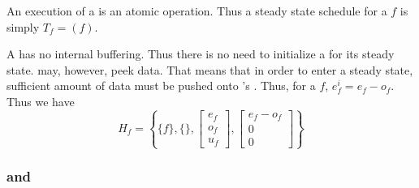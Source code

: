 \begin{comment}
This section will develop hierarchical scheduling techniques to
create initialization and steady state schedules. A simple
implementation of the hierarchical scheduling creates a
single-appearance schedule.  While single-appearance scheduling is
quite effective in scheduling {\StreamIt} programs, it is also easy
to construct programs that have {\feedbackloops} that are impossible
to schedule.  To alleviate the problem, the single-appearance
scheduling was slightly modified to allow {\feedbackloops} to
schedule programs using hierarchical push scheduling.  This does
not solve the problem altogether (some {\feedbackloops} are still
impossible to schedule using this technique), but this technique
is able to schedule many programs which cannot be scheduled with a
simple single-appearance scheduler.

Sample streams for techniques described here are taken from Figure
\ref{fig:hierarchical-schedule}.  The streams in Figure
\ref{fig:hierarchical-schedule} are identical to those in Figure
\ref{fig:steady-state} with exception of the {\feedbackloop}.
\end{comment}

\subsubsection{\filter}

An execution of a {\filter} is an atomic operation.  Thus a steady
state schedule for a {\filter} $f$ is simply $T_f = (f)$.

A {\filter} has no internal buffering.  Thus there is no need to
initialize a {\filter} for its steady state.  {\filters} may,
however, peek data.  That means that in order to enter a steady
state, sufficient amount of data must be pushed onto {\filter}'s
{\Input} {{\Channel}}.  Thus, for a {\filter} $f$, $e^i_f = e_f -
o_f$. Thus we have $$H_f = \left\{\{f\}, \{\}, \left[
\begin{array}{c}
e_f\\o_f\\u_f
\end{array}\right], \left[
\begin{array}{c}
e_f-o_f\\0\\0\end{array}\right] \right\}
$$

\subsubsection{\pipelines and \splitjoins}

